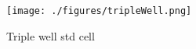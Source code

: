 
\begin{figure}[h]
	\label{fig_triplewellstdcell}
	\centering
	\texttt{[image: ./figures/tripleWell.png]}
	\caption{Triple well std cell}
\end{figure}

